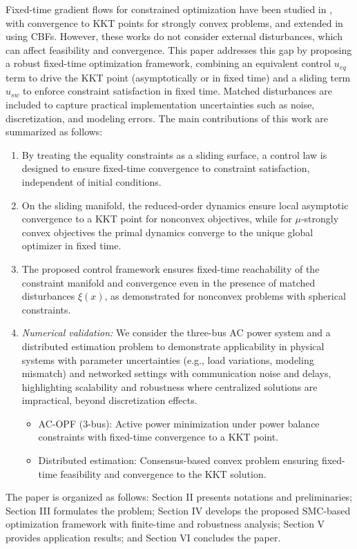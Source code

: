 \documentclass[letterpaper, 10 pt, conference]{ieeeconf}
\begin{document}
Fixed-time gradient flows for constrained optimization have been studied in \cite{OJ24,garg_fixed}, with convergence to KKT points for strongly convex problems, and extended in \cite{diana2025finite} using CBFs. However, these works do not consider external disturbances, which can affect feasibility and convergence. This paper addresses this gap by proposing a robust fixed-time optimization framework, combining an equivalent control $u_{eq}$ term \cite{utkin2013sliding,kamal2026robust} to drive the KKT point (asymptotically or in fixed time) and a sliding term $u_{sw}$ \cite{moulay_fxt,kamal2026robust} to enforce constraint satisfaction in fixed time. Matched disturbances are included to capture practical implementation uncertainties such as noise, discretization, and modeling errors. The main contributions of this work are summarized as follows:
\begin{enumerate}
    \item By treating the equality constraints as a sliding surface, a control law is designed to ensure fixed-time convergence to constraint satisfaction, independent of initial conditions.
    \item On the sliding manifold, the reduced-order dynamics ensure local asymptotic convergence to a KKT point for nonconvex objectives, while for $\mu$-strongly convex objectives the primal dynamics converge to the unique global optimizer in fixed time.
    \item The proposed control framework ensures fixed-time reachability of the constraint manifold and convergence even in the presence of matched disturbances $\xi(x)$, as demonstrated for nonconvex problems with spherical constraints.
    \item \textit{Numerical validation:} We consider the three-bus AC power system and a distributed estimation problem to demonstrate applicability in physical systems with parameter uncertainties (e.g., load variations, modeling mismatch) and networked settings with communication noise and delays, highlighting scalability and robustness where centralized solutions are impractical, beyond discretization effects.
\begin{itemize}
    \item AC-OPF (3-bus): Active power minimization under power balance constraints with fixed-time convergence to a KKT point.
    \item Distributed estimation: Consensus-based convex problem ensuring fixed-time feasibility and convergence to the KKT solution.
\end{itemize}
\end{enumerate}
The paper is organized as follows: Section II presents notations and preliminaries; Section III formulates the problem; Section IV develops the proposed SMC-based optimization framework with finite-time and robustness analysis; Section V provides application results; and Section VI concludes the paper.
\end{document}
